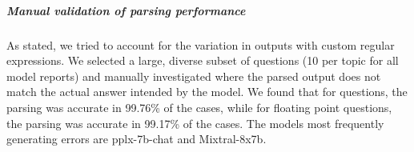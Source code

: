 \subparagraph*{Manual validation of parsing performance}

As stated, we tried to account for the variation in outputs with custom regular expressions.
We selected a large, diverse subset of questions (10 per topic for all model reports) and manually investigated where the parsed output does not match the actual answer intended by the model.
We found that for  questions, the parsing was accurate in 99.76\% of the cases, while for floating point questions, the parsing was accurate in 99.17\% of the cases.
The models most frequently generating errors are pplx-7b-chat and Mixtral-8x7b.

